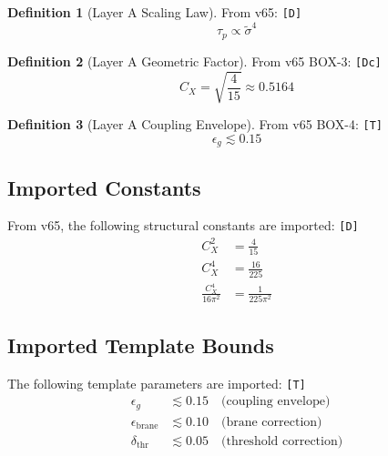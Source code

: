 \documentclass[11pt,a4paper]{article}
\newcommand{\tagD}{\textcolor{green!50!black}{\texttt{[D]}}}
\newcommand{\tagDc}{\textcolor{blue!70!black}{\texttt{[Dc]}}}
\newcommand{\tagT}{\textcolor{cyan!70!black}{\texttt{[T]}}}
\theoremstyle{definition}
\newtheorem{definition}{Definition}[section]
\begin{document}
\begin{definition}[Layer A Scaling Law]
\label{def:scaling-import}
From v65: \tagD{}
\begin{equation}
\label{eq:scaling-layera}
\tau_p \propto \tilde{\sigma}^4
\end{equation}
\end{definition}

\begin{definition}[Layer A Geometric Factor]
\label{def:cx-import}
From v65 BOX-3: \tagDc{}
\begin{equation}
\label{eq:cx-layera}
C_X = \sqrt{\frac{4}{15}} \approx 0.5164
\end{equation}
\end{definition}

\begin{definition}[Layer A Coupling Envelope]
\label{def:epsilon-import}
From v65 BOX-4: \tagT{}
\begin{equation}
\label{eq:epsilon-layera}
\epsilon_g \lesssim 0.15
\end{equation}
\end{definition}

\subsection{Imported Constants}
\label{subsec:imported-constants}

From v65, the following structural constants are imported: \tagD{}
\begin{align}
\label{eq:import-cx-sq}
C_X^2 &= \frac{4}{15} \\
\label{eq:import-cx-4}
C_X^4 &= \frac{16}{225} \\
\label{eq:import-prefactor}
\frac{C_X^4}{16\pi^2} &= \frac{1}{225\pi^2}
\end{align}

\subsection{Imported Template Bounds}
\label{subsec:imported-templates}

The following template parameters are imported: \tagT{}
\begin{align}
\label{eq:import-eps-g}
\epsilon_g &\lesssim 0.15 \quad \text{(coupling envelope)} \\
\label{eq:import-eps-brane}
\epsilon_{\text{brane}} &\lesssim 0.10 \quad \text{(brane correction)} \\
\label{eq:import-delta-thr}
\delta_{\text{thr}} &\lesssim 0.05 \quad \text{(threshold correction)}
\end{align}
\end{document}
